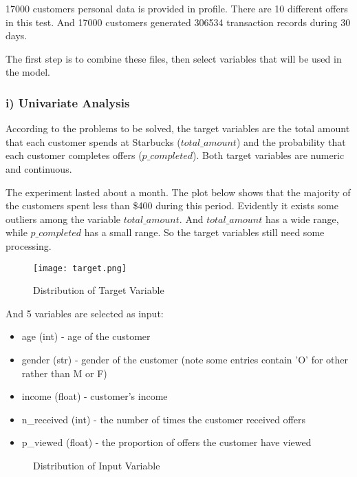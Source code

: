 \documentclass[a4paper,12pt]{article}
\begin{document}
17000 customers personal data is provided in profile. There are 10 different offers in this test. And 17000 customers generated 
306534 transaction records during 30 days.

The first step is to combine these files, then select variables that will be used in the model. 

\subsubsection*{i) Univariate Analysis}

According to the problems to be solved, the target variables are the total amount that each customer spends at Starbucks 
($total\_amount$) and the probability that each customer completes offers ($p\_completed$). Both target variables are numeric 
and continuous.

The experiment lasted about a month. The plot below shows that the majority of the customers spent less than \$400 during this 
period. Evidently it exists some outliers among the variable $total\_amount$. And $total\_amount$ has a wide range, while 
$p\_completed$ has a small range. So the target variables still need some processing.

\begin{figure}[H]
    \centering
    \texttt{[image: target.png]} 
    \caption{Distribution of Target Variable}
\end{figure}

And 5 variables are selected as input:

\begin{itemize}

    \item age (int) - age of the customer
    \item gender (str) - gender of the customer (note some entries contain 'O' for other rather than M or F)
    \item income (float) - customer's income
    \item n\_received (int) - the number of times the customer received offers
    \item p\_viewed (float) - the proportion of offers the customer have viewed

\end{itemize}

\begin{figure}[H]
    \centering
    \caption{Distribution of Input Variable}
\end{figure}
\end{document}
